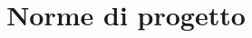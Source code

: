 \documentclass[12pt]{article}
\title{Norme di progetto}
\begin{document}
	\makefirstpage
	
	
	\clearpage
	
	\tableofcontents
	\clearpage
	
	
	
	
	
	\label{sec:bib}
    
    
\end{document}
